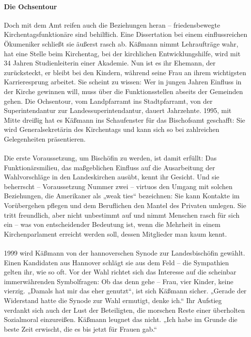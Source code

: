 \documentclass[a4paper,12pt,oneside]{scrbook}
\begin{document}
\paragraph{Die Ochsentour}
Doch mit dem Amt reifen auch die Beziehungen heran – friedensbewegte Kirchentagsfunktionäre sind behilflich. Eine Dissertation bei einem einflussreichen Ökumeniker schließt sie äußerst rasch ab. Käßmann nimmt Lehraufträge wahr, hat eine Stelle beim Kirchentag, bei der kirchlichen Entwicklungshilfe, wird mit 34 Jahren Studienleiterin einer Akademie. Nun ist es ihr Ehemann, der zurücksteckt, er bleibt bei den Kindern, während seine Frau an ihrem wichtigsten Karrieresprung arbeitet. Sie scheint zu wissen: Wer in jungen Jahren Einfluss in der Kirche gewinnen will, muss über die Funktionsstellen abseits der Gemeinden gehen. Die Ochsentour, vom Landpfarramt ins Stadtpfarramt, von der Superintendantur zur Landessuperintendantur, dauert Jahrzehnte. 1995, mit Mitte dreißig hat es Käßmann ins Schaufenster für das Bischofsamt geschafft: Sie wird Generalsekretärin des Kirchentags und kann sich so bei zahlreichen Gelegenheiten präsentieren.
\\\\
Die erste Voraussetzung, um Bischöfin zu werden, ist damit erfüllt: Das Funktionärsmilieu, das maßgeblichen Einfluss auf die Ausarbeitung der Wahlvorschläge in den Landeskirchen ausübt, kennt ihr Gesicht. Und sie beherrscht – Voraussetzung Nummer zwei – virtuos den Umgang mit solchen Beziehungen, die Amerikaner als „weak ties“ bezeichnen: Sie kann Kontakte im Vorübergehen pflegen und dem Beruflichen den Mantel des Privaten umlegen. Sie tritt freundlich, aber nicht unbestimmt auf und nimmt Menschen rasch für sich ein – was von entscheidender Bedeutung ist, wenn die Mehrheit in einem Kirchenparlament erreicht werden soll, dessen Mitglieder man kaum kennt.
\\\\
1999 wird Käßmann von der hannoverschen Synode zur Landesbischöfin gewählt. Einen Kandidaten aus Hannover schlägt sie aus dem Feld – die Sympathien gelten ihr, wie so oft. Vor der Wahl richtet sich das Interesse auf die scheinbar immerwährenden Symbolfragen: Ob das denn gehe – Frau, vier Kinder, keine vierzig. „Damals hat mir das eher genutzt“, ist sich Käßmann sicher. „Gerade der Widerstand hatte die Synode zur Wahl ermutigt, denke ich.“ Ihr Aufstieg verdankt sich auch der Lust der Beteiligten, die morschen Reste einer überholten Sozialmoral einzureißen. Käßmann leugnet das nicht. „Ich habe im Grunde die beste Zeit erwischt, die es bis jetzt für Frauen gab.“
\end{document}
